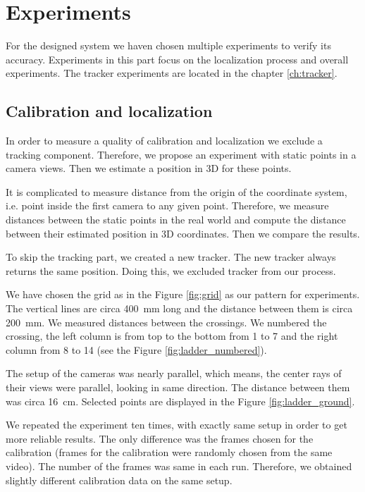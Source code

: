 \chapter{Experiments} 

For the designed system we haven chosen multiple experiments to
verify its accuracy. Experiments in this part focus on the localization process
and overall experiments. The tracker experiments are located in the chapter
\ref{ch:tracker}.

\section{Calibration and localization}
\label{s:experiment-static}

In order to measure a quality of calibration and localization we exclude a
tracking component. Therefore, we propose an experiment with static points in a
camera views. Then we estimate a position in 3D for these points.

It is complicated to measure distance from the origin of the coordinate system,
i.e. point inside the first camera to any given point. Therefore, we measure
distances between the static points in the real world and compute the distance
between their estimated position in 3D coordinates. Then we compare the results.

To skip the tracking part, we created a new tracker.  The new tracker always
returns the same position.  Doing this, we excluded tracker from our process.

We have chosen the grid as in the Figure \ref{fig:grid} as our pattern for experiments.
The vertical lines are circa 400~mm long and the distance between them is circa
200~mm. We measured distances between the crossings. We numbered the crossing,
the left column is from top to the bottom from 1 to 7 and the right column from
8 to 14 (see the Figure \ref{fig:ladder_numbered}).

The setup of the cameras was nearly parallel, which means, the center rays of
their views were parallel, looking in same direction. The distance between them
was circa 16~cm. Selected points are displayed in the Figure
\ref{fig:ladder_ground}. 

We repeated the experiment ten times, with exactly same setup in order to get
more reliable results. The only difference was the frames chosen for the
calibration (frames for the calibration were randomly chosen from the same
video). The number of the frames was same in each run. Therefore, we obtained
slightly different calibration data on the same setup.


